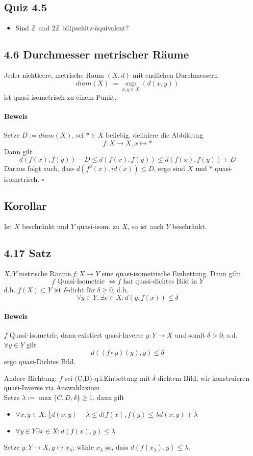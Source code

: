 \documentclass{article}
\newcommand{\Z}{\mathbb{Z}}
\newcommand{\qed}{$\square$}
\begin{document}
\subsection{Quiz 4.5}
\begin{itemize}
	\item Sind $\Z$ und $2\Z$ bilipschitz-äquivalent?
\end{itemize}

\subsection{4.6 Durchmesser metrischer Räume}
Jeder nichtleere, metrische Raum $(X,d)$ mit endlichen Durchmessern
\[diam(X) := \sup_{x,y\in X}(d(x,y)) \]
ist quasi-isometrisch zu einem Punkt.
\paragraph{Beweis}
Setze $D:= diam(X)$, sei $* \in X$ beliebig. definiere die Abbildung
\[f:X \longrightarrow X, x \longmapsto *\]
Dann gilt
\[d(f(x), f(y)) - D \leq d(f(x),f(y)) \leq d(f(x),f(y)) + D \]
Daraus folgt auch, dass $d(f^2(x), id(x)) \leq D$, ergo sind $X$ und $*$ quasi-isometrisch.
\qed
\subsection{Korollar}
Ist $X$ beschränkt und $Y$ quasi-isom. zu $X$, so ist auch $Y$ beschränkt.

\subsection{4.17 Satz}
$X,Y$ metrische Räume,$f:X\rightarrow Y$ eine quasi-isometrische Einbettung. Dann gilt:
\[f \text{ Quasi-Isometrie }\Longleftrightarrow f \text{ hat quasi-dichtes Bild in }Y \]
d.h. $f(X) \subset Y$ ist $\delta$-dicht für $\delta \geq 0$, d.h.
\[\forall y\in Y, \exists x \in X: d(y,f(x)) \leq \delta \]

\paragraph{Beweis}
$f$ Quasi-Isometrie, dann existiert quasi-Inverse $g : Y \rightarrow X$ und somit $\delta > 0$, s.d. $\forall y \in Y$ gilt
\[d((f\circ g)(y), y) \leq \delta \]
ergo quasi-Dichtes Bild.

Andere Richtung: $f$ sei (C,D)-q.i.Einbettung mit $\delta$-dichtem Bild, wir konstruieren quasi-Inverse via Auswahlaxiom\\
Setze $\lambda := \max\{C,D,\delta\} \geq 1$, dann gilt
\begin{itemize}
	\item $\forall x,y \in X:  \frac{1}{\lambda} d(x,y) - \lambda \leq d(f(x),f(y) \leq {\lambda} d(x,y) + \lambda  $
	\item $\forall y \in Y \exists x \in X: d(f(x),y) \leq \lambda$
\end{itemize}
Setze $g:Y\rightarrow X, y \longmapsto x_\lambda $; wähle $x_\lambda$ so, dass $d(f(x_\lambda), y) \leq \lambda$.\\
\end{document}
